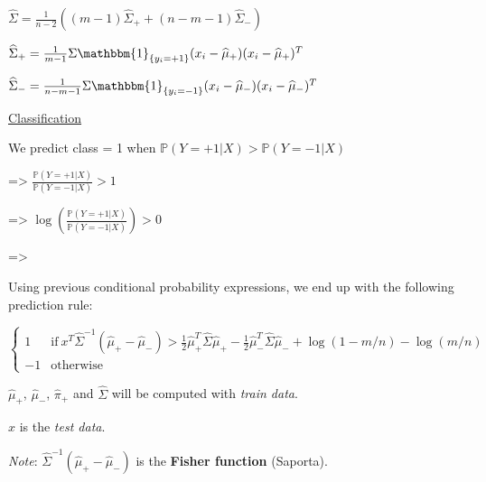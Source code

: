 $\widehat{\Sigma} = \frac{1}{n-2} ((m-1) \widehat{\Sigma}_+ + (n-m-1)\widehat{\Sigma}_-)$

$\widehat{\Sigma}_+ = \frac{1}{m-1} \Sigma \mathbbm{1}_{\{y_i=+1\}}(x_i-\widehat{\mu}_+)(x_i-\widehat{\mu}_+)^T$

$\widehat{\Sigma}_- = \frac{1}{n-m-1} \Sigma \mathbbm{1}_{\{y_i=-1\}}(x_i-\widehat{\mu}_-)(x_i-\widehat{\mu}_-)^T$

 \vspace{3mm}

\underline{Classification}

We predict class = 1 when $\mathbb{P}(Y=+1 | X) > \mathbb{P}(Y=-1 | X)$

=> $\frac{\mathbb{P}(Y=+1 | X)}{\mathbb{P}(Y=-1 | X)} > 1$

=> $\log(\frac{\mathbb{P}(Y=+1 | X)}{\mathbb{P}(Y=-1 | X)}) > 0$

=> 

Using previous conditional probability expressions, we end up with the following prediction rule:

  \begin{equation}
    \begin{cases}
      1 & \text{if}\ x^T\widehat{\Sigma}^{-1}(\widehat{\mu}_+ - \widehat{\mu}_-) > \frac{1}{2}\widehat{\mu}_+^T\widehat{\Sigma}\widehat{\mu}_+ - \frac{1}{2}\widehat{\mu}_-^T\widehat{\Sigma}\widehat{\mu}_- + \log(1-m/n) - \log(m/n) \\
      -1 & \text{otherwise}
    \end{cases}
  \end{equation}

$\widehat{\mu}_+$, $\widehat{\mu}_-$, $\widehat{\pi}_+$ and $\widehat{\Sigma}$ will be computed with \textit{train data}.

 $x$ is the \textit{test data}.

\vspace{3mm}

\textit{Note}: $\widehat{\Sigma}^{-1}(\widehat{\mu}_+ - \widehat{\mu}_-)$ is the \textbf{Fisher function} (Saporta).

